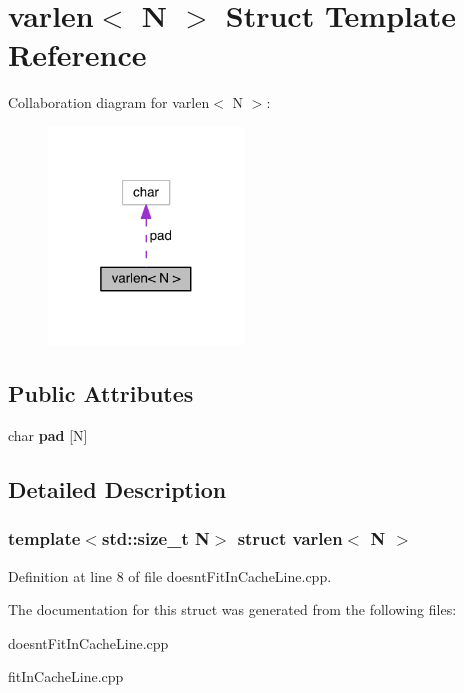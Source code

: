 \hypertarget{structvarlen}{}\section{varlen$<$ N $>$ Struct Template Reference}
\label{structvarlen}


Collaboration diagram for varlen$<$ N $>$\+:
\nopagebreak
\begin{figure}[H]
\begin{center}
\leavevmode
\includegraphics[width=148pt]{structvarlen__coll__graph}
\end{center}
\end{figure}
\subsection*{Public Attributes}
\begin{DoxyCompactItemize}
\item 
\hypertarget{structvarlen_a6a586ab9d4985b37bf09f81de648749f}{}\label{structvarlen_a6a586ab9d4985b37bf09f81de648749f} 
char {\bfseries pad} \mbox{[}N\mbox{]}
\end{DoxyCompactItemize}


\subsection{Detailed Description}
\subsubsection*{template$<$std\+::size\+\_\+t N$>$\newline
struct varlen$<$ N $>$}



Definition at line 8 of file doesnt\+Fit\+In\+Cache\+Line.\+cpp.



The documentation for this struct was generated from the following files\+:\begin{DoxyCompactItemize}
\item 
doesnt\+Fit\+In\+Cache\+Line.\+cpp\item 
fit\+In\+Cache\+Line.\+cpp\end{DoxyCompactItemize}
